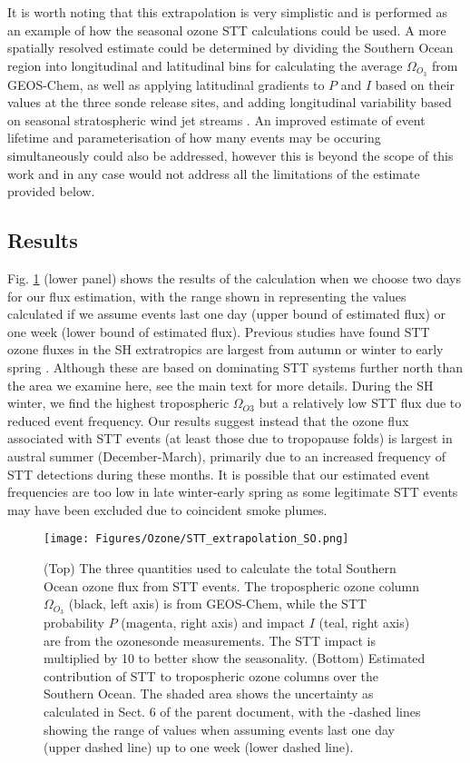   It is worth noting that this extrapolation is very simplistic and is performed as an example of how the seasonal ozone STT calculations could be used.
  A more spatially resolved estimate could be determined by dividing the Southern Ocean region into longitudinal and latitudinal bins for calculating the average $\Omega_{O_3}$ from GEOS-Chem, as well as applying latitudinal gradients to $P$ and $I$ based on their values at the three sonde release sites, and adding longitudinal variability based on seasonal stratospheric wind jet streams \parencite{Baray2012, Skerlak2015}.
  An improved estimate of event lifetime and parameterisation of how many events may be occuring simultaneously could also be addressed, however this is beyond the scope of this work and in any case would not address all the limitations of the estimate provided below.
  \subsection{Results}
  
  Fig. \ref{App:ozonesupplement:fig_SOExtrapolation} (lower panel) shows the results of the calculation when we choose two days for our flux estimation, with the range shown in representing the values calculated if we assume events last one day (upper bound of estimated flux) or one week (lower bound of estimated flux).
  Previous studies have found STT ozone fluxes in the SH extratropics are largest from autumn or winter to early spring \parencite{Olsen2003, Skerlak2015, Liu2016}.
  Although these are based on dominating STT systems further north than the area we examine here, see the main text for more details.
  During the SH winter, we find the highest tropospheric $\Omega_{O3}$ but a relatively low STT flux due to reduced event frequency.
  Our results suggest instead that the ozone flux associated with STT events (at least those due to tropopause folds) is largest in austral summer (December-March), primarily due to an increased frequency of STT detections during these months.
  It is possible that our estimated event frequencies are too low in late winter-early spring as some legitimate STT events may have been excluded due to coincident smoke plumes.
  
  \begin{figure}[t]
    \texttt{[image: Figures/Ozone/STT\_extrapolation\_SO.png]}
    \caption{%
      (Top) The three quantities used to calculate the total Southern Ocean ozone flux from STT events.
      The tropospheric ozone column $\Omega_{O_3}$ (black, left axis) is from GEOS-Chem, while the STT probability $P$ (magenta, right axis) and impact $I$ (teal, right axis) are from the ozonesonde measurements.
      The STT impact is multiplied by 10 to better show the seasonality.
      (Bottom) Estimated contribution of STT to tropospheric ozone columns over the Southern Ocean.
      The shaded area shows the uncertainty as calculated in Sect. 6 of the parent document, with the -dashed lines showing the range of values when assuming events last one day (upper dashed line) up to one week (lower dashed line).}
    \label{App:ozonesupplement:fig_SOExtrapolation}
  \end{figure}
  
